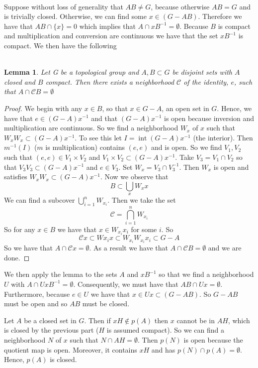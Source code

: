 \documentclass{article}
\DeclareMathOperator{\interior}{\text{int}}
\newcommand{\problem}[1]{\noindent{\textbf{Problem #1}}\\}
\newcommand{\problempart}[1]{\noindent{\textbf{(#1)}}}
\newtheorem*{lem}{\\ Lemma}
\begin{document}
\problem{3.26.13} 
\problempart{a} Suppose without loss of generality that $AB \neq G$, because otherwise $AB = G$ and is trivially closed. Otherwise, we can find some $x \in (G - AB)$. Therefore we have that $AB \cap \{x\} = 0$ which implies that $A \cap xB^{-1} = \emptyset$. Because $B$ is compact and multiplication and conversion are continuous we have that the set $xB^{-1}$ is compact. We then have the following
\begin{lem}
Let G be a topological group and $A,B \subset G$ be disjoint sets with $A$ closed and $B$ compact. Then there exists a neighborhood $\mathcal{C}$ of the identity, $e$, such that $A \cap \mathcal{C}B = \emptyset$ 
\end{lem}
\begin{proof}
We begin with any $x \in B$, so that $x \in G - A$, an open set in $G$. Hence, we have that $e \in (G-A)x^{-1}$ and that $ (G-A)x^{-1}$ is open because inversion and multiplication are continuous. So we find a neighborhood $W_x$ of $x$ such that $W_xW_x \subset (G-A)x^{-1}$. To see this let $I = \interior (G-A)x^{-1}$ (the interior). Then $m^{-1}(I)$ ($m$ is multiplication) contains $(e,e)$ and is open. So we find $V_1, V_2$ such that $(e,e) \in V_1 \times V_2$ and $V_1 \times V_2 \subset  (G-A)x^{-1}$. Take $V_3 = V_1\cap V_2$ so that $V_3V_3 \subset  (G-A)x^{-1}$ and $e \in V_3$. Set $W_x = V_3 \cap V_3^{-1}$. Then $W_x$ is open and satisfies $W_xW_x \subset  (G-A)x^{-1}$. Now we observe that 
\[
B \subset \bigcup_x W_xx
\]
We can find a subcover $\bigcup_{i=1}^n W_{x_i}$. Then we take the set 
\[
\mathcal{C} = \bigcap_{i=1}^n W_{x_i}
\]
So for any $x \in B$ we have that $x\in W_{x_i}x_i$ for some $i$. So 
\[
\mathcal{C}x \subset Wx_ix \subset W_{x_i}W_{x_i}x_i \subset G-A
\]
So  we have that $A \cap \mathcal{C}x = \emptyset$. As a result we have that $A \cap \mathcal{C}B = \emptyset$ and we are done.
\end{proof}
We then apply the lemma to the sets $A$ and $xB^{-1}$ so that we find a neighborhood $U$ with $A \cap UxB^{-1} = \emptyset$. Consequently, we must have that $AB \cap Ux = \emptyset$. Furthermore, because $e \in U$ we have that $x \in Ux \subset (G - AB)$. So $G - AB$ must be open and so $AB$ must be closed. 
 
\problempart{b} Let $A$ be a closed set in $G$. Then if $xH \not\in p(A)$ then $x$ cannot be in $AH$, which is closed by the previous part ($H$ is assumed compact). So we can find a neighborhood $N$ of $x$ such that $N \cap AH = \emptyset$. Then $p(N)$ is open because the quotient map is open. Moreover, it contains $xH$ and has $p(N) \cap p(A) = \emptyset$. Hence, $p(A)$ is closed. 
\end{document}
